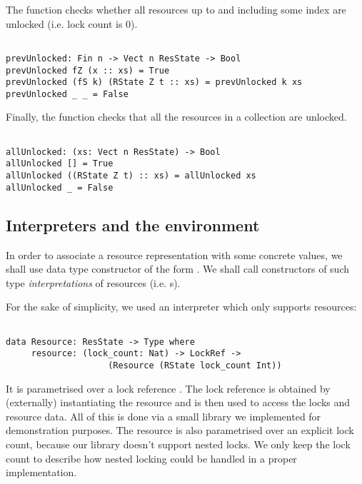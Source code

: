 The  function checks whether all resources up to and
including some index are unlocked (i.e. lock count is 0).

\begin{BVerbatim}

prevUnlocked: Fin n -> Vect n ResState -> Bool
prevUnlocked fZ (x :: xs) = True
prevUnlocked (fS k) (RState Z t :: xs) = prevUnlocked k xs
prevUnlocked _ _ = False

\end{BVerbatim}

Finally, the  function checks that all the resources in a
collection are unlocked.

\begin{BVerbatim}

allUnlocked: (xs: Vect n ResState) -> Bool
allUnlocked [] = True
allUnlocked ((RState Z t) :: xs) = allUnlocked xs
allUnlocked _ = False

\end{BVerbatim}

\subsection{Interpreters and the environment}

In order to associate a  resource representation with some
concrete values, we shall use data type constructor of the form
. We shall call constructors of such type
\emph{interpretations} of resources (i.e. s).

For the sake of simplicity, we used an interpreter which only
supports  resources:

\begin{BVerbatim}

data Resource: ResState -> Type where
     resource: (lock_count: Nat) -> LockRef ->
                    (Resource (RState lock_count Int))

\end{BVerbatim}

It is parametrised over a lock reference . The lock reference is
obtained by (externally) instantiating the resource and is then used to access
the locks and resource data. All of this is done via a small 
library we implemented for demonstration purposes. The resource is also
parametrised over an explicit lock count, because our library doesn't support
nested locks. We only keep the lock count to describe how nested locking could
be handled in a proper implementation.

